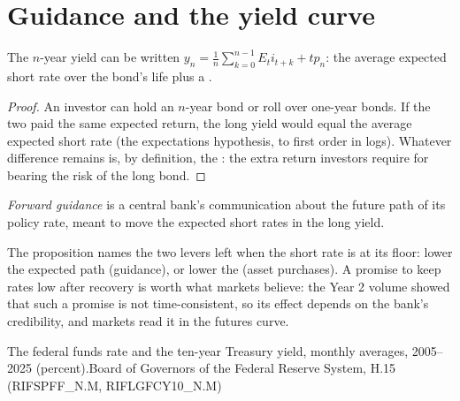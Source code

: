 \section{Guidance and the yield curve}\label{sec:b3:central-banking:guidance}

\begin{proposition}\label{prop:b3:central-banking:term}
The $n$-year yield can be written $y_n = \frac1n\sum_{k=0}^{n-1}E_ti_{t+k} + \mathit{tp}_n$: the average expected
short rate over the bond's life plus a .
\end{proposition}

\begin{proof}
An investor can hold an $n$-year bond or roll over one-year bonds. If the two paid
the same expected return, the long yield would equal the average expected short
rate (the expectations hypothesis, to first order in logs). Whatever difference
remains is, by definition, the : the extra return investors require
for bearing the risk of the long bond.
\end{proof}

\begin{definition}\label{def:b3:central-banking:forward-guidance}
\emph{Forward guidance} is a central bank's communication about the future path of
its policy rate, meant to move the expected short rates in the long yield.
\end{definition}

The proposition names the two levers left when the short rate is at its floor:
lower the expected path (guidance), or lower the  (asset purchases).
A promise to keep rates low after recovery is worth what markets believe: the
Year 2 volume showed that such a promise is not time-consistent, so its effect
depends on the bank's credibility, and markets read it in the futures curve.

\begin{omchart}{The federal funds rate and the ten-year Treasury yield, monthly averages,
2005--2025 (percent).}{Board of Governors of the Federal Reserve System, H.15
(RIFSPFF\_N.M, RIFLGFCY10\_N.M)}
\end{omchart}

